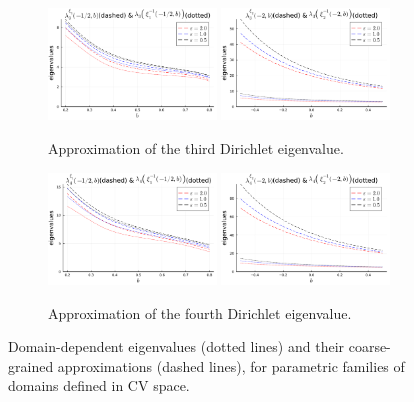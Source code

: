 \begin{figure}
\begin{subfigure}{\linewidth}
    \includegraphics[width=0.49\textwidth]{figures/03/2d/lambda/l3_xi1_beta=2.0.pdf}
    \includegraphics[width=0.49\textwidth]{figures/03/2d/lambda/l3_xi2_beta=2.0.pdf}
    \caption[]{Approximation of the third Dirichlet eigenvalue.}
\end{subfigure}
\begin{subfigure}{\linewidth}
    \includegraphics[width=0.49\textwidth]{figures/03/2d/lambda/l4_xi1_beta=2.0.pdf}
    \includegraphics[width=0.49\textwidth]{figures/03/2d/lambda/l4_xi2_beta=2.0.pdf}
    \caption[]{Approximation of the fourth Dirichlet eigenvalue.}
\end{subfigure}
\caption[]{Domain-dependent eigenvalues (dotted lines) and their coarse-grained approximations (dashed lines), for parametric families of domains defined in CV space.}
\label{03:fig:coarse_grained_val}
\end{figure}

